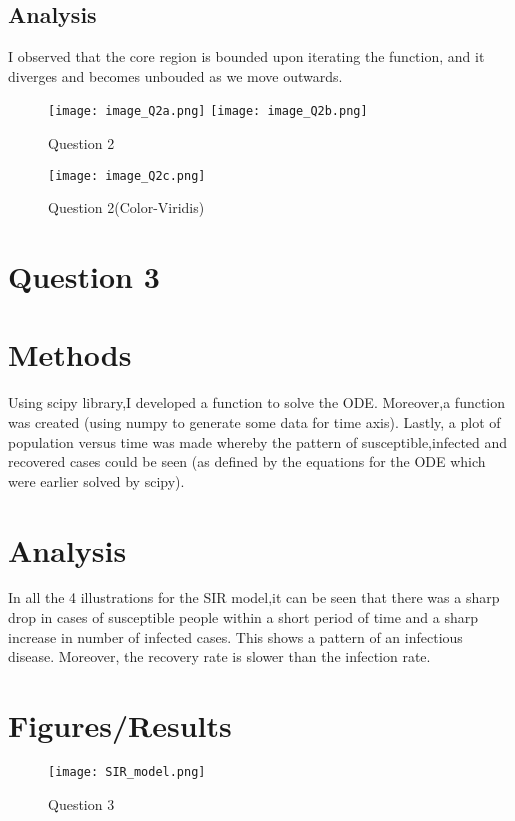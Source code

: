 \documentclass{article}
\begin{document}
\subsection*{Analysis}

I observed that the core region is bounded upon iterating the function, and it diverges and becomes unbouded as we move outwards. 

\newpage

\begin{figure} 
  \texttt{[image: image\_Q2a.png]}
  \texttt{[image: image\_Q2b.png]}
  \caption{Question 2}
  
\end{figure}


\begin{figure}
    \centering
    \texttt{[image: image\_Q2c.png]}
    \caption{Question 2(Color-Viridis)}
    
    
\end{figure}


\section*{Question 3}

\section*{Methods}

Using scipy library,I developed a function to solve the ODE. Moreover,a function was created (using numpy to generate some data for time axis). Lastly, a plot of population versus time was made whereby the pattern of susceptible,infected and recovered cases could be seen (as defined by the equations for the ODE which were earlier solved by scipy). 

\section*{Analysis}

In all the 4 illustrations for the SIR model,it can be seen that there was a sharp drop in cases of susceptible people within a short period of time and a sharp increase in number of infected cases. This shows a pattern of an infectious disease. Moreover, the recovery rate is slower than the infection rate.

\section*{Figures/Results}

\begin{figure} 
  \texttt{[image: SIR\_model.png]}
  \caption{Question 3}
  
\end{figure}
\end{document}
